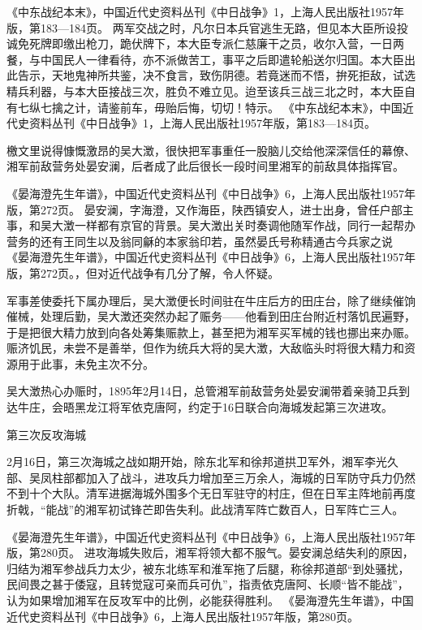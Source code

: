 \documentclass[12pt,UTF8]{ctexbook}
\begin{document}
《中东战纪本末》，中国近代史资料丛刊《中日战争》1，上海人民出版社1957年版，第183—184页。
两军交战之时，凡尔日本兵官逃生无路，但见本大臣所设投诚免死牌即缴出枪刀，跪伏牌下，本大臣专派仁慈廉干之员，收尔入营，一日两餐，与中国民人一律看待，亦不派做苦工，事平之后即遣轮船送尔归国。本大臣出此告示，天地鬼神所共鉴，决不食言，致伤阴德。若竟迷而不悟，拚死拒敌，试选精兵利器，与本大臣接战三次，胜负不难立见。迨至该兵三战三北之时，本大臣自有七纵七擒之计，请鉴前车，毋贻后悔，切切！特示。 《中东战纪本末》，中国近代史资料丛刊《中日战争》1，上海人民出版社1957年版，第183—184页。

檄文里说得慷慨激昂的吴大澂，很快把军事重任一股脑儿交给他深深信任的幕僚、湘军前敌营务处晏安澜，后者成了此后很长一段时间里湘军的前敌具体指挥官。

《晏海澄先生年谱》，中国近代史资料丛刊《中日战争》6，上海人民出版社1957年版，第272页。
晏安澜，字海澄，又作海臣，陕西镇安人，进士出身，曾任户部主事，和吴大澂一样都有京官的背景。吴大澂出关时奏调他随军作战，同行一起帮办营务的还有王同生以及翁同龢的本家翁印若，虽然晏氏号称精通古今兵家之说 《晏海澄先生年谱》，中国近代史资料丛刊《中日战争》6，上海人民出版社1957年版，第272页。，但对近代战争有几分了解，令人怀疑。

军事差使委托下属办理后，吴大澂便长时间驻在牛庄后方的田庄台，除了继续催饷催械，处理后勤，吴大澂还突然办起了赈务——他看到田庄台附近村落饥民遍野，于是把很大精力放到向各处筹集赈款上，甚至把为湘军买军械的钱也挪出来办赈。赈济饥民，未尝不是善举，但作为统兵大将的吴大澂，大敌临头时将很大精力和资源用于此事，未免主次不分。

吴大澂热心办赈时，1895年2月14日，总管湘军前敌营务处晏安澜带着亲骑卫兵到达牛庄，会晤黑龙江将军依克唐阿，约定于16日联合向海城发起第三次进攻。

第三次反攻海城

2月16日，第三次海城之战如期开始，除东北军和徐邦道拱卫军外，湘军李光久部、吴凤柱部都加入了战斗，进攻兵力增加至三万余人，海城的日军防守兵力仍然不到十个大队。清军进据海城外围多个无日军驻守的村庄，但在日军主阵地前再度折戟，“能战”的湘军初试锋芒即告失利。此战清军阵亡数百人，日军阵亡三人。

《晏海澄先生年谱》，中国近代史资料丛刊《中日战争》6，上海人民出版社1957年版，第280页。
进攻海城失败后，湘军将领大都不服气。晏安澜总结失利的原因，归结为湘军参战兵力太少，被东北练军和淮军拖了后腿，称徐邦道部“到处骚扰，民间畏之甚于倭寇，且转觉寇可亲而兵可仇”，指责依克唐阿、长顺“皆不能战”，认为如果增加湘军在反攻军中的比例，必能获得胜利。 《晏海澄先生年谱》，中国近代史资料丛刊《中日战争》6，上海人民出版社1957年版，第280页。
\end{document}
